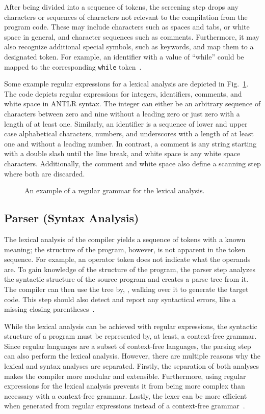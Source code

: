 After being divided into a sequence of tokens, the screening step drops any characters or sequences of characters not relevant to the compilation from the program code.
These may include characters such as spaces and tabs, or white space in general, and character sequences such as comments. 
Furthermore, it may also recognize additional special symbols, such as keywords, and map them to a designated token. For example, an identifier with a value of ``while'' could be mapped to the corresponding \texttt{while} token~\cite{DeRe74}.

Some example regular expressions for a lexical analysis are depicted in Fig.~\ref{fig:example_lexer}. The code depicts regular expressions for integers, identifiers, comments, and white space in ANTLR syntax.
The integer can either be an arbitrary sequence of characters between zero and nine without a leading zero or just zero with a length of at least one. Similarly, an identifier is a sequence of lower and upper case alphabetical characters, numbers, and underscores with a length of at least one and without a leading number. In contrast, a comment is any string starting with a double slash until the line break, and white space is any white space characters. Additionally, the comment and white space also define a scanning step where both are discarded.

\begin{figure}[htp]
    \centering
    
    \caption{An example of a regular grammar for the lexical analysis.}
    \label{fig:example_lexer}
\end{figure}

\subsection{Parser (Syntax Analysis)}
\label{sec:background_parser}
The lexical analysis of the compiler yields a sequence of tokens with a known meaning; the structure of the program, however, is not apparent in the token sequence. For example, an operator token does not indicate what the operands are. To gain knowledge of the structure of the program, the parser step analyzes the syntactic structure of the source program and creates a parse tree from it. The compiler can then use the tree by, \eg, walking over it to generate the target code. This step should also detect and report any syntactical errors, like a missing closing parentheses~\cite{VSSD07}.

While the lexical analysis can be achieved with regular expressions, the syntactic structure of a program must be represented by, at least, a context-free grammar. Since regular languages are a subset of context-free languages, the parsing step can also perform the lexical analysis. However, there are multiple reasons why the lexical and syntax analyses are separated. Firstly, the separation of both analyses makes the compiler more modular and extensible. Furthermore, using regular expressions for the lexical analysis prevents it from being more complex than necessary with a context-free grammar. Lastly, the lexer can be more efficient when generated from regular expressions instead of a context-free grammar~\cite{VSSD07}.

